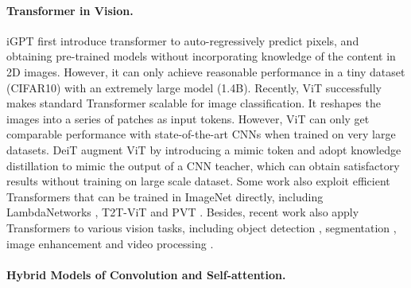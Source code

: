 \documentclass[10pt,twocolumn,letterpaper]{article}
\begin{document}
\paragraph{Transformer in Vision.} 
iGPT \cite{DBLP:conf/icml/ChenRC0JLS20} first introduce transformer to auto-regressively predict pixels, and obtaining pre-trained models without incorporating knowledge of the content in 2D images. However, it can only achieve reasonable performance in a tiny dataset (CIFAR10) with an extremely large model (1.4B). 
Recently, ViT \cite{dosovitskiy2021an} successfully makes standard Transformer scalable for image classification. It reshapes the images into a series of  patches as input tokens. However, ViT can only get comparable performance with state-of-the-art CNNs when trained on very large datasets.
DeiT \cite{DBLP:journals/corr/abs-2012-12877} augment ViT by introducing a mimic token and adopt knowledge distillation to mimic the output of a CNN teacher, which can obtain satisfactory results without training on large scale dataset.
Some work also exploit efficient Transformers that can be trained in ImageNet directly, including LambdaNetworks \cite{bello2021lambdanetworks}, 
T2T-ViT \cite{DBLP:journals/corr/abs-2101-11986} and PVT \cite{DBLP:journals/corr/abs-2102-12122}.
Besides, recent work also apply Transformers to various vision tasks, including object detection \cite{DBLP:conf/eccv/CarionMSUKZ20,zhu2021deformable}, segmentation \cite{DBLP:journals/corr/abs-2011-14503}, image enhancement \cite{DBLP:journals/corr/abs-2012-00364,DBLP:conf/cvpr/YangYFLG20} and video processing \cite{DBLP:conf/eccv/ZengFC20,DBLP:conf/cvpr/ZhouZCSX18}.



\paragraph{Hybrid Models of Convolution and Self-attention.}
\end{document}
